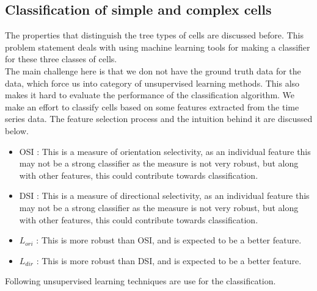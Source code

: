 \documentclass[11pt]{article}
\begin{document}
\FloatBarrier
\subsection{Classification of simple and complex cells} %
\label{sub:classification_of_simple_and_complex_cells}
The properties that distinguish the tree types of cells are discussed before. This problem statement deals with using machine learning tools for making a classifier for these three classes of cells.\\
The main challenge here is that we don not have the ground truth data for the data, which force us into category of unsupervised learning methods. This also makes it hard to evaluate the performance of the classification algorithm. We make an effort to classify cells based on some features extracted from the time series data. The feature selection process and the intuition behind it are discussed below.
\begin{itemize}
    \item OSI : This is a measure of orientation selectivity, as an individual feature this may not be a strong classifier as the measure is not very robust, but along with other features, this could contribute towards classification.
    \item DSI : This is a measure of directional selectivity, as an individual feature this may not be a strong classifier as the measure is not very robust, but along with other features, this could contribute towards classification.
    \item $L_{ori}$ : This is more robust than OSI, and is expected to be a better feature.
    \item $L_{dir}$ : This is more robust than DSI, and is expected to be a better feature.
\end{itemize}
Following unsupervised learning techniques are use for the classification.
\end{document}
